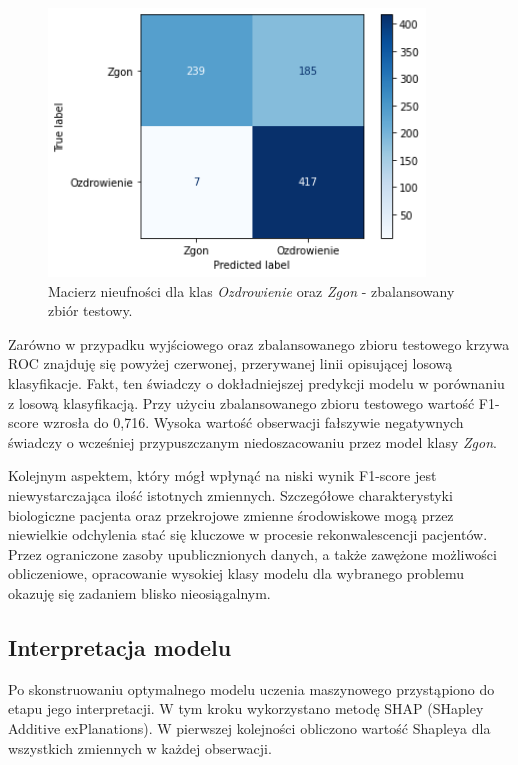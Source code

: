 \documentclass[polish, twoside, 12pt, a4paper]{article}
\theoremstyle{definition}
\theoremstyle{plain}
\theoremstyle{remark}
\begin{document}
\begin{figure}[H]
\centering
\includegraphics[width=10cm]{conf_matrix_balanced.png}
\caption{Macierz nieufności dla klas \emph{Ozdrowienie} oraz \emph{Zgon} - zbalansowany zbiór testowy.}
\end{figure}

Zarówno w przypadku wyjściowego oraz zbalansowanego zbioru testowego krzywa ROC znajduję się powyżej czerwonej, przerywanej linii opisującej losową klasyfikacje. Fakt, ten świadczy o dokładniejszej predykcji modelu w porównaniu z losową klasyfikacją. Przy użyciu zbalansowanego zbioru testowego wartość F1-score wzrosła do 0,716. Wysoka wartość obserwacji fałszywie negatywnych świadczy o wcześniej przypuszczanym niedoszacowaniu przez model klasy \emph{Zgon}.

Kolejnym aspektem, który mógł wpłynąć na niski wynik F1-score jest niewystarczająca ilość istotnych zmiennych. Szczegółowe charakterystyki biologiczne pacjenta oraz przekrojowe zmienne środowiskowe mogą przez niewielkie odchylenia stać się kluczowe w procesie rekonwalescencji pacjentów. Przez ograniczone zasoby upublicznionych danych, a także zawężone możliwości obliczeniowe, opracowanie wysokiej klasy modelu dla wybranego problemu okazuję się zadaniem blisko nieosiągalnym.

\subsection{Interpretacja modelu}

Po skonstruowaniu optymalnego modelu uczenia maszynowego przystąpiono do etapu jego interpretacji. W tym kroku wykorzystano metodę SHAP (SHapley Additive exPlanations). W pierwszej kolejności obliczono wartość Shapleya dla wszystkich zmiennych w każdej obserwacji. 
\end{document}
